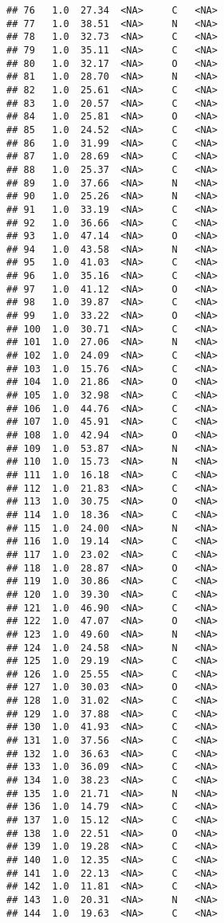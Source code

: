 \documentclass[
]{article}
\begin{document}
\begin{verbatim}
## 76   1.0  27.34  <NA>     C   <NA>
## 77   1.0  38.51  <NA>     N   <NA>
## 78   1.0  32.73  <NA>     C   <NA>
## 79   1.0  35.11  <NA>     C   <NA>
## 80   1.0  32.17  <NA>     O   <NA>
## 81   1.0  28.70  <NA>     N   <NA>
## 82   1.0  25.61  <NA>     C   <NA>
## 83   1.0  20.57  <NA>     C   <NA>
## 84   1.0  25.81  <NA>     O   <NA>
## 85   1.0  24.52  <NA>     C   <NA>
## 86   1.0  31.99  <NA>     C   <NA>
## 87   1.0  28.69  <NA>     C   <NA>
## 88   1.0  25.37  <NA>     C   <NA>
## 89   1.0  37.66  <NA>     N   <NA>
## 90   1.0  25.26  <NA>     N   <NA>
## 91   1.0  33.19  <NA>     C   <NA>
## 92   1.0  36.66  <NA>     C   <NA>
## 93   1.0  47.14  <NA>     O   <NA>
## 94   1.0  43.58  <NA>     N   <NA>
## 95   1.0  41.03  <NA>     C   <NA>
## 96   1.0  35.16  <NA>     C   <NA>
## 97   1.0  41.12  <NA>     O   <NA>
## 98   1.0  39.87  <NA>     C   <NA>
## 99   1.0  33.22  <NA>     O   <NA>
## 100  1.0  30.71  <NA>     C   <NA>
## 101  1.0  27.06  <NA>     N   <NA>
## 102  1.0  24.09  <NA>     C   <NA>
## 103  1.0  15.76  <NA>     C   <NA>
## 104  1.0  21.86  <NA>     O   <NA>
## 105  1.0  32.98  <NA>     C   <NA>
## 106  1.0  44.76  <NA>     C   <NA>
## 107  1.0  45.91  <NA>     C   <NA>
## 108  1.0  42.94  <NA>     O   <NA>
## 109  1.0  53.87  <NA>     N   <NA>
## 110  1.0  15.73  <NA>     N   <NA>
## 111  1.0  16.18  <NA>     C   <NA>
## 112  1.0  21.83  <NA>     C   <NA>
## 113  1.0  30.75  <NA>     O   <NA>
## 114  1.0  18.36  <NA>     C   <NA>
## 115  1.0  24.00  <NA>     N   <NA>
## 116  1.0  19.14  <NA>     C   <NA>
## 117  1.0  23.02  <NA>     C   <NA>
## 118  1.0  28.87  <NA>     O   <NA>
## 119  1.0  30.86  <NA>     C   <NA>
## 120  1.0  39.30  <NA>     C   <NA>
## 121  1.0  46.90  <NA>     C   <NA>
## 122  1.0  47.07  <NA>     O   <NA>
## 123  1.0  49.60  <NA>     N   <NA>
## 124  1.0  24.58  <NA>     N   <NA>
## 125  1.0  29.19  <NA>     C   <NA>
## 126  1.0  25.55  <NA>     C   <NA>
## 127  1.0  30.03  <NA>     O   <NA>
## 128  1.0  31.02  <NA>     C   <NA>
## 129  1.0  37.88  <NA>     C   <NA>
## 130  1.0  41.93  <NA>     C   <NA>
## 131  1.0  37.56  <NA>     C   <NA>
## 132  1.0  36.63  <NA>     C   <NA>
## 133  1.0  36.09  <NA>     C   <NA>
## 134  1.0  38.23  <NA>     C   <NA>
## 135  1.0  21.71  <NA>     N   <NA>
## 136  1.0  14.79  <NA>     C   <NA>
## 137  1.0  15.12  <NA>     C   <NA>
## 138  1.0  22.51  <NA>     O   <NA>
## 139  1.0  19.28  <NA>     C   <NA>
## 140  1.0  12.35  <NA>     C   <NA>
## 141  1.0  22.13  <NA>     C   <NA>
## 142  1.0  11.81  <NA>     C   <NA>
## 143  1.0  20.31  <NA>     N   <NA>
## 144  1.0  19.63  <NA>     C   <NA>

\end{verbatim}
\end{document}
